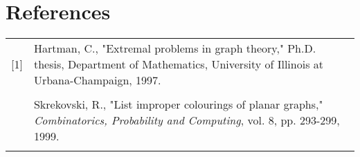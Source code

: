 \documentclass[12pt,a4paper]{article}
\begin{document}
\begin{comment}
\noindent We set $P$ to be the single vertex path $x$ and use continue\_path$(P)$ to find the desired path.
Then we color $P$, setting $\lambda(v)=c$ for all $v\in P$.\\

\section{Algorithm}

Let $P=c_0c_1\ldots c_i$ be the path clockwise along the outer face connecting $x=c_0$ and $y=c_i$.
Let $N(v)[u,v]$ denote the list of neighbors of $v$ from $u$ to $v$, inclusive, in clockwise embedded order. We
denote $N(v)(u,v)$ 
\end{comment}

\section*{References}

\begin{tabularx}{\linewidth}{lX}
[1] & Hartman, C., "Extremal problems in graph theory," Ph.D. thesis, Department of Mathematics,
University of Illinois at Urbana-Champaign, 1997.\\\\\relax
[2] & Skrekovski, R., "List improper colourings of planar graphs,"
\emph{Combinatorics, Probability and Computing}, vol. 8, pp. 293-299, 1999.\\\relax
\end{tabularx}

\begin{comment}
[3] & Eaton, N., N. Hull, "Defective list colorings of planar graphs,"
\emph{Bulletin of the Institute for Combinatorics and its Applications}, 1999.\\\relax
[4] & Poh, K., "On the linear vertex-arboricity of a planar graph," \emph{Journal of Graph Theory},
vol. 14, pp. 73-75, 1990\\\relax
[5] & Kant, G., "Algorithms for drawing planar graphs," Ph.D. thesis, Department of Computer Science,
Utrecht University, 1993.\\\relax
[6] & Tarjan, R., "Depth-first search and linear graph algorithms," SIAM Journal on Computing, vol. 1, pp.
146-160, 1972.\\\relax
\end{comment}
\end{document}
